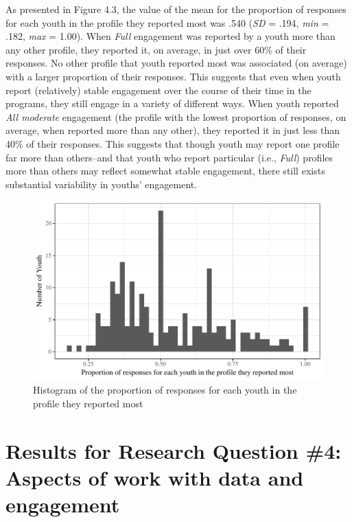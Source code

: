 \documentclass[]{book}
\theoremstyle{definition}
\theoremstyle{definition}
\theoremstyle{definition}
\theoremstyle{remark}
\begin{document}
As presented in Figure 4.3, the value of the mean for the proportion of
responses for each youth in the profile they reported most was .540
(\emph{SD} = .194, \emph{min} = .182, \emph{max} = 1.00). When
\emph{Full} engagement was reported by a youth more than any other
profile, they reported it, on average, in just over 60\% of their
responses. No other profile that youth reported most was associated (on
average) with a larger proportion of their responses. This suggests that
even when youth report (relatively) stable engagement over the course of
their time in the programs, they still engage in a variety of different
ways. When youth reported \emph{All moderate} engagement (the profile
with the lowest proportion of responses, on average, when reported more
than any other), they reported it in just less than 40\% of their
responses. This suggests that though youth may report one profile far
more than others--and that youth who report particular (i.e.,
\emph{Full}) profiles more than others may reflect somewhat stable
engagement, there still exists substantial variability in youths'
engagement.

\begin{figure}

{\centering \includegraphics[width=0.8\linewidth]{rosenberg-dissertation_files/figure-latex/unnamed-chunk-13-1} 

}

\caption{Histogram of the proportion of responses for each youth in the profile they reported most}\label{fig:unnamed-chunk-13}
\end{figure}

\section{Results for Research Question \#4: Aspects of work with data
and
engagement}\label{results-for-research-question-4-aspects-of-work-with-data-and-engagement}
\end{document}

